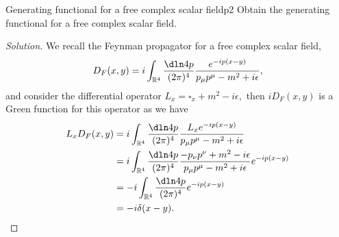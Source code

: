 \begin{problem}{Generating functional for a free complex scalar field}{p2}
    Obtain the generating functional for a free complex scalar field.
\end{problem}
\begin{proof}[Solution]
    We recall the Feynman propagator for a free complex scalar field,
    \begin{equation*}
        D_F(x,y) = i \int_{\mathbb{R}^4}\frac{\dln4p}{(2\pi)^4} \frac{e^{-ip(x-y)}}{p_\mu p^\mu - m^2 + i \epsilon},
    \end{equation*}
    and consider the differential operator \(L_x = \square_x + m^2 - i \epsilon,\) then \(iD_F(x,y)\) is a Green function for this operator as we have
    \begin{align*}
        L_x D_F(x,y) &= i \int_{\mathbb{R}^4} \frac{\dln4p}{(2\pi)^4} \frac{L_x e^{-i p(x-y)}}{p_\mu p^\mu - m^2 + i \epsilon}\\
                     &= i \int_{\mathbb{R}^4} \frac{\dln4p}{(2\pi)^4} \frac{-p_\nu p^\nu + m^2 - i \epsilon}{p_\mu p^\mu - m^2 + i \epsilon} e^{-ip(x-y)}\\
                     &= -i \int_{\mathbb{R}^4} \frac{\dln4p}{(2\pi)^4} e^{-ip(x-y)}\\
                     &= -i \delta(x-y).
    \end{align*}
\end{proof}
